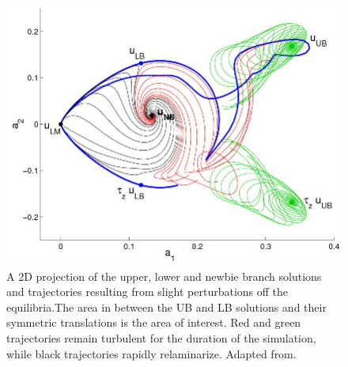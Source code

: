 \begin{figure}[h]
\centerline{
\includegraphics[scale=0.4]{Figs/stateSpace}}
\caption{A 2D projection of the upper, lower and newbie branch solutions and trajectories resulting from slight perturbations off the equilibria.The area in between the UB and LB solutions and their symmetric translations is the area of interest. Red and green trajectories remain turbulent for the duration of the simulation, while black trajectories rapidly relaminarize.   Adapted from.}\label{fig:UBLBStateSpace}
\end{figure}

